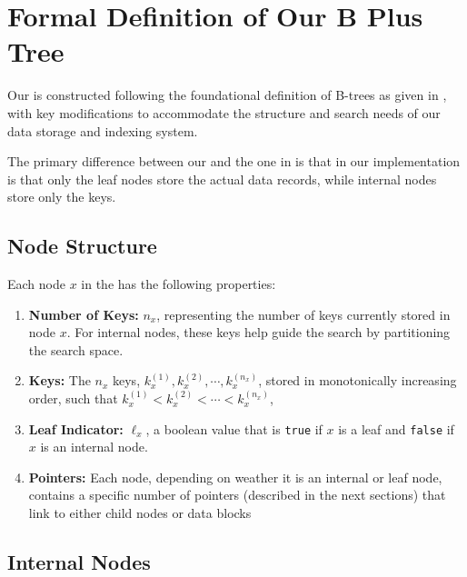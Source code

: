 \section{Formal Definition of Our B Plus Tree}
\label{appendix:bplustreearch}

Our \bplustree is constructed following the foundational definition of B-trees as given in \cite{cormen2022introduction}, with key modifications to accommodate the structure and search needs of our data storage and indexing system.

The primary difference between our \bplustree and the one in \cite{cormen2022introduction} is that in our implementation is that only the leaf nodes store the actual data records, while internal nodes store only the keys.

\subsection{Node Structure}

Each node $x$ in the \bplustree has the following properties:\begin{enumerate}
        \item \textbf{Number of Keys:} $n_x$, representing the number of keys currently stored in node $x$. For internal nodes, these keys help guide the search by partitioning the search space.
        \item \textbf{Keys:} The $n_x$ keys, $k^{(1)}_x,k^{(2)}_x,\cdots,k^{(n_x)}_x$, stored in monotonically increasing order, such that $k^{(1)}_x<k^{(2)}_x<\cdots<k^{(n_x)}_x$,
        \item \textbf{Leaf Indicator:} $\ell_x$, a boolean value that is \texttt{true} if $x$ is a leaf and \texttt{false} if $x$ is an internal node.
        \item \textbf{Pointers:} Each node, depending on weather it is an internal or leaf node, contains a specific number of pointers (described in the next sections) that link to either child nodes or data blocks
    \end{enumerate}

\subsection{Internal Nodes}

